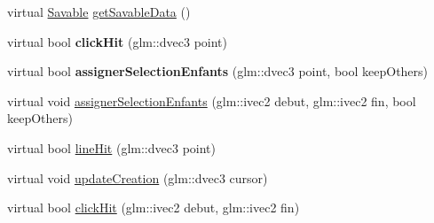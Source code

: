 \begin{DoxyCompactItemize}
\item 
virtual \hyperlink{class_savable}{Savable} \hyperlink{group__inf2990_ga1729231ec41b3ba4d6668eba101ead44}{get\-Savable\-Data} ()
\item 
\hypertarget{group__inf2990_gaa43f307d42d6dd8890cdce48c5c53128}{virtual bool {\bfseries click\-Hit} (glm\-::dvec3 point)}\label{group__inf2990_gaa43f307d42d6dd8890cdce48c5c53128}

\item 
\hypertarget{group__inf2990_ga4214cc2ab8bb23ab67c10387d7d1ef5e}{virtual bool {\bfseries assigner\-Selection\-Enfants} (glm\-::dvec3 point, bool keep\-Others)}\label{group__inf2990_ga4214cc2ab8bb23ab67c10387d7d1ef5e}

\item 
virtual void \hyperlink{group__inf2990_ga7304995555625461f49b1e75dd81e888}{assigner\-Selection\-Enfants} (glm\-::ivec2 debut, glm\-::ivec2 fin, bool keep\-Others)
\item 
virtual bool \hyperlink{group__inf2990_gaf7c1f8526b0f7da001e9c3cb5e8e3540}{line\-Hit} (glm\-::dvec3 point)
\item 
virtual void \hyperlink{group__inf2990_ga233fd4600812176c557bb94ea04da5c9}{update\-Creation} (glm\-::dvec3 cursor)
\end{DoxyCompactItemize}
{\bf }\par
\begin{DoxyCompactItemize}
\item 
virtual bool \hyperlink{group__inf2990_gad1d1a9c6adcedfcd5eda6c6d4e67a50f}{click\-Hit} (glm\-::ivec2 debut, glm\-::ivec2 fin)
\end{DoxyCompactItemize}


